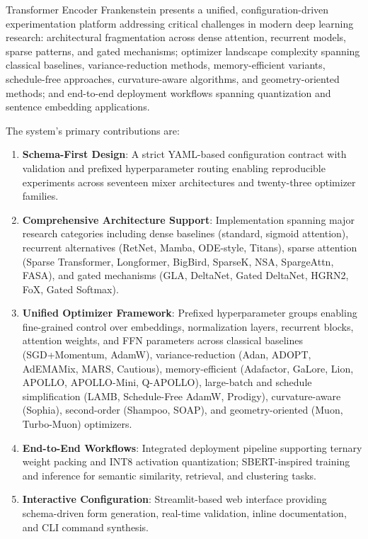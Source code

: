 \documentclass[11pt,a4paper]{article}
\begin{document}
Transformer Encoder Frankenstein presents a unified, configuration-driven experimentation platform addressing critical challenges in modern deep learning research: architectural fragmentation across dense attention, recurrent models, sparse patterns, and gated mechanisms; optimizer landscape complexity spanning classical baselines, variance-reduction methods, memory-efficient variants, schedule-free approaches, curvature-aware algorithms, and geometry-oriented methods; and end-to-end deployment workflows spanning quantization and sentence embedding applications.

The system's primary contributions are:
\begin{enumerate}[leftmargin=*]
    \item \textbf{Schema-First Design}: A strict YAML-based configuration contract with validation and prefixed hyperparameter routing enabling reproducible experiments across seventeen mixer architectures and twenty-three optimizer families.
    \item \textbf{Comprehensive Architecture Support}: Implementation spanning major research categories including dense baselines (standard, sigmoid attention), recurrent alternatives (RetNet, Mamba, ODE-style, Titans), sparse attention (Sparse Transformer, Longformer, BigBird, SparseK, NSA, SpargeAttn, FASA), and gated mechanisms (GLA, DeltaNet, Gated DeltaNet, HGRN2, FoX, Gated Softmax).
    \item \textbf{Unified Optimizer Framework}: Prefixed hyperparameter groups enabling fine-grained control over embeddings, normalization layers, recurrent blocks, attention weights, and FFN parameters across classical baselines (SGD+Momentum, AdamW), variance-reduction (Adan, ADOPT, AdEMAMix, MARS, Cautious), memory-efficient (Adafactor, GaLore, Lion, APOLLO, APOLLO-Mini, Q-APOLLO), large-batch and schedule simplification (LAMB, Schedule-Free AdamW, Prodigy), curvature-aware (Sophia), second-order (Shampoo, SOAP), and geometry-oriented (Muon, Turbo-Muon) optimizers.
    \item \textbf{End-to-End Workflows}: Integrated deployment pipeline supporting ternary weight packing and INT8 activation quantization; SBERT-inspired training and inference for semantic similarity, retrieval, and clustering tasks.
    \item \textbf{Interactive Configuration}: Streamlit-based web interface providing schema-driven form generation, real-time validation, inline documentation, and CLI command synthesis.
\end{enumerate}
\end{document}
